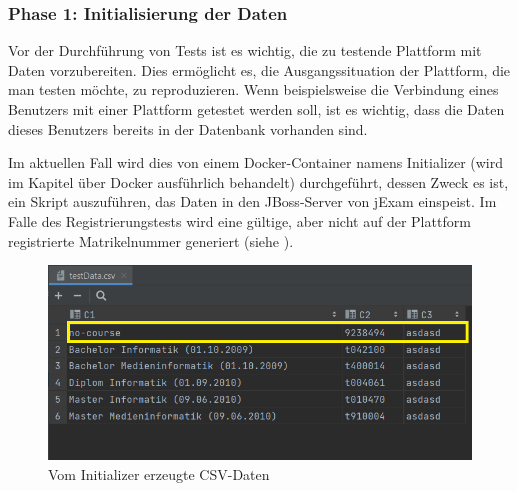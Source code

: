 \subsubsection{Phase 1: Initialisierung der Daten}

Vor der Durchführung von Tests ist es wichtig, die zu testende
Plattform mit Daten vorzubereiten. Dies ermöglicht es, die
Ausgangssituation der Plattform, die man testen möchte, zu
reproduzieren. Wenn beispielsweise die Verbindung eines Benutzers
mit einer Plattform getestet werden soll, ist es wichtig, dass die
Daten dieses Benutzers bereits in der Datenbank vorhanden sind.

Im aktuellen Fall wird dies von einem Docker-Container namens
Initializer (wird im Kapitel über Docker ausführlich behandelt)
durchgeführt, dessen Zweck es ist, ein Skript auszuführen, das Daten
in den JBoss-Server von jExam einspeist. Im Falle des
Registrierungstests wird eine gültige, aber nicht auf der
Plattform registrierte Matrikelnummer generiert (siehe ).

\begin{figure}[H]
    \centering
    \includegraphics[scale=0.7]{images/testData}
    \caption{Vom Initializer erzeugte CSV-Daten} \label{fig:testData}
\end{figure}